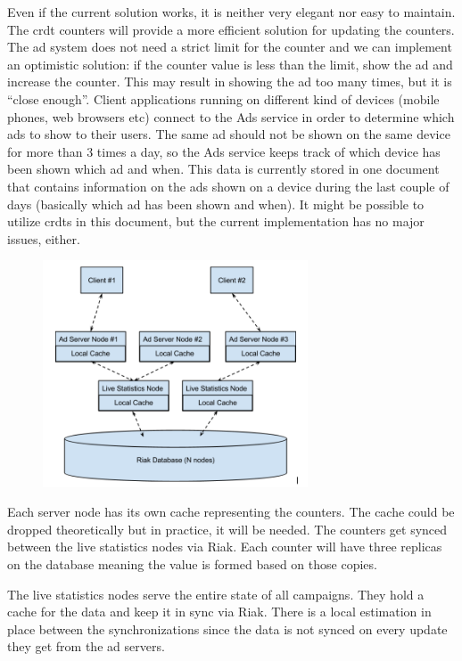 \documentclass[11pt,a4paper]{report}
\begin{document}
Even if the current solution works, it is neither very elegant nor easy to maintain. The \gls{crdt} counters will provide a more efficient solution for updating the counters. The ad system does not need a strict limit for the counter and we can implement an optimistic solution: if the counter value is less than the limit, show the ad and increase the counter. This may result in showing the ad too many times, but it is ``close enough''. Client applications running on different kind of devices (mobile phones, web browsers etc) connect to the Ads service in order to determine which ads to show to their users. The same ad should not be shown on the same device for more than 3 times a day, so the Ads service keeps track of which device has been shown which ad and when. This data is currently stored in one document that contains information on the ads shown on a device during the last couple of days (basically which ad has been shown and when). It might be possible to utilize \glspl{crdt} in this document, but the current implementation has no major issues, either.

\begin{figure}[!h]
	\centering
	\includegraphics[width=0.7\textwidth]{./img/image1.png}
\end{figure}
Each server node has its own cache representing the counters. The cache could be dropped theoretically but in practice, it will be needed. The counters get synced between the live statistics nodes via Riak. Each counter will have three replicas on the database meaning the value is formed based on those copies.

The live statistics nodes serve the entire state of all campaigns. They hold a cache for the data and keep it in sync via Riak. There is a local estimation in place between the synchronizations since the data is not synced on every update they get from the ad servers.
\end{document}
